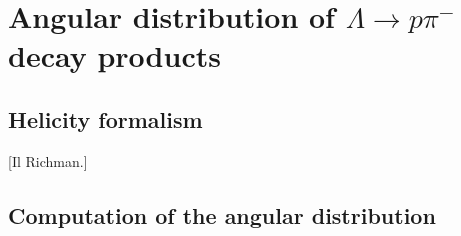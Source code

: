 \chapter{Angular distribution of \texorpdfstring{$\Lambda \rightarrow p\pi^-$}{Lambda to proton-pion} decay products} \label{chap:angular-distribution}

\section{Helicity formalism}
[Il Richman.]

\section{Computation of the angular distribution}